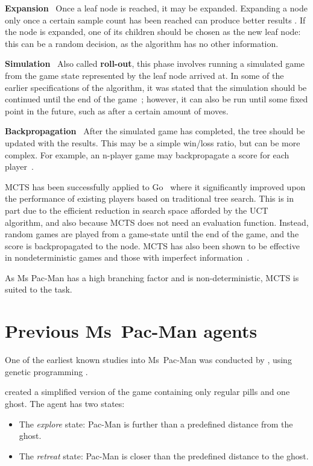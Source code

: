 \textbf{Expansion} ~Once a leaf node is reached, it may be expanded.  Expanding a node only once a certain sample count has been reached can produce better results .  If the node is expanded, one of its children should be chosen as the new leaf node: this can be a random decision, as the algorithm has no other information.

\textbf{Simulation} ~Also called \textbf{roll-out}, this phase involves running a simulated game from the game state represented by the leaf node arrived at.  In some of the earlier specifications of the algorithm, it was stated that the simulation should be continued until the end of the game~\citep{Chaslot2008}; however, it can also be run until some fixed point in the future, such as after a certain amount of moves.

\textbf{Backpropagation} ~After the simulated game has completed, the tree should be updated with the results.  This may be a simple win/loss ratio, but can be more complex.  For example, an n-player game may backpropagate a score for each player~\citep{Samothrakis2011}.

MCTS has been successfully applied to Go~\citep{Gelly2006} where it significantly improved upon the performance of existing players based on traditional tree search.  This is in part due to the efficient reduction in search space afforded by the UCT algorithm, and also because MCTS does not need an evaluation function.  Instead, random games are played from a game-state until the end of the game, and the score is backpropagated to the node.  MCTS has also been shown to be effective in nondeterministic games and those with imperfect information~\citep{Kocsis2006}.

As Ms Pac-Man has a high branching factor and is non-deterministic, MCTS is suited to the task.

\section{Previous Ms~Pac-Man agents}

One of the earliest known studies into Ms~Pac-Man was conducted by \citet{Koza1992}, using genetic programming .

\citet{Gallagher2003} created a simplified version of the game containing only regular pills and one ghost.  The agent has two states:

\begin{itemize}
\item The \emph{explore} state: Pac-Man is further than a predefined distance from the ghost.
\item The \emph{retreat} state: Pac-Man is closer than the predefined distance to the ghost.
\end{itemize}


